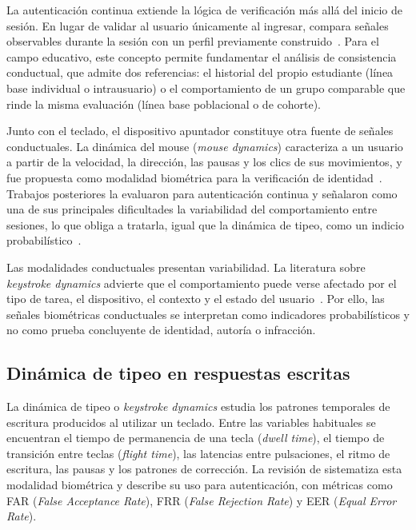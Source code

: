 La autenticación continua extiende la lógica de verificación más allá del inicio de sesión. En lugar de validar al usuario únicamente al ingresar, compara señales observables durante la sesión con un perfil previamente construido~\parencite{Yampolskiy2008}. Para el campo educativo, este concepto permite fundamentar el análisis de consistencia conductual, que admite dos referencias: el historial del propio estudiante (línea base individual o intrausuario) o el comportamiento de un grupo comparable que rinde la misma evaluación (línea base poblacional o de cohorte).

Junto con el teclado, el dispositivo apuntador constituye otra fuente de señales conductuales. La dinámica del mouse (\textit{mouse dynamics}) caracteriza a un usuario a partir de la velocidad, la dirección, las pausas y los clics de sus movimientos, y fue propuesta como modalidad biométrica para la verificación de identidad~\parencite{Ahmed2007}. Trabajos posteriores la evaluaron para autenticación continua y señalaron como una de sus principales dificultades la variabilidad del comportamiento entre sesiones, lo que obliga a tratarla, igual que la dinámica de tipeo, como un indicio probabilístico~\parencite{Shen2013}.

Las modalidades conductuales presentan variabilidad. La literatura sobre \textit{keystroke dynamics} advierte que el comportamiento puede verse afectado por el tipo de tarea, el dispositivo, el contexto y el estado del usuario~\parencite{Teh2013}. Por ello, las señales biométricas conductuales se interpretan como indicadores probabilísticos y no como prueba concluyente de identidad, autoría o infracción.

\subsection{Dinámica de tipeo en respuestas escritas}
\label{sec:dinamica_tipeo}

La dinámica de tipeo o \textit{keystroke dynamics} estudia los patrones temporales de escritura producidos al utilizar un teclado. Entre las variables habituales se encuentran el tiempo de permanencia de una tecla (\textit{dwell time}), el tiempo de transición entre teclas (\textit{flight time}), las latencias entre pulsaciones, el ritmo de escritura, las pausas y los patrones de corrección. La revisión de \textcite{Teh2013} sistematiza esta modalidad biométrica y describe su uso para autenticación, con métricas como FAR (\textit{False Acceptance Rate}), FRR (\textit{False Rejection Rate}) y EER (\textit{Equal Error Rate}).

